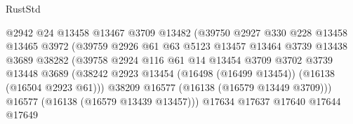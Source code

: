 \begin{lexlean}{RustStd}
\begin{coremodule}
                                        @2942
                                        @24
                                        @13458
                                        @13467
                                        @3709
                                        @13482
                                        (@39750
                                          @2927
                                          @330
                                          @228
                                          @13458
                                          @13465
                                          @3972
                                          (@39759
                                            @2926
                                            @61
                                            @63
                                            @5123
                                            @13457
                                            @13464
                                            @3739
                                            @13438
                                            @3689
                                            @38282
                                            (@39758
                                              @2924
                                              @116
                                              @61
                                              @14
                                              @13454
                                              @3709
                                              @3702
                                              @3739
                                              @13448
                                              @3689
                                              (@38242
                                                @2923
                                                @13454
                                                (@16498 (@16499 @13454))
                                                (@16138 (@16504 @2923 @61)))
                                              @38209
                                              @16577
                                              (@16138 (@16579 @13449 @3709)))
                                            @16577
                                            (@16138 (@16579 @13439 @13457)))
                                          @17634
                                          @17637
                                          @17640
                                          @17644
                                          @17649

\end{coremodule}
\end{lexlean}
